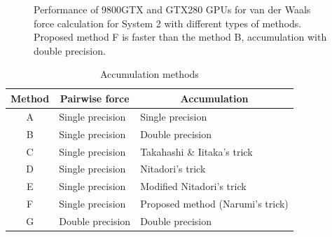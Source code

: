 \begin{figure}
\begin{center}
\vspace*{-5mm}
\caption{Performance of 9800GTX and GTX280 GPUs for van der Waals force
  calculation for System 2 with different types of methods. 
  Proposed method F is faster than the method B,
  accumulation with double precision.}
\label{fig:perf}
\vspace*{-5mm}
\end{center}
\end{figure}

\begin{table}
\caption{Accumulation methods}\label{tbl:method}
\begin{center}\footnotesize
\begin{tabular}{|c|l|l|}
\hline
Method & \multicolumn{1}{c|}{Pairwise force} 
       & \multicolumn{1}{c|}{Accumulation} \\
\hline
\hline
A & Single precision & Single precision \\
\hline
B & Single precision & Double precision \\
\hline
C & Single precision & Takahashi \& Iitaka's trick \\
\hline
D & Single precision & Nitadori's trick \\
\hline
E & Single precision & Modified Nitadori's trick \\
\hline
F & Single precision & Proposed method (Narumi's trick) \\
\hline
G & Double precision & Double precision\\
\hline
\end{tabular}
\vspace*{-3mm}
\end{center}
\end{table}

